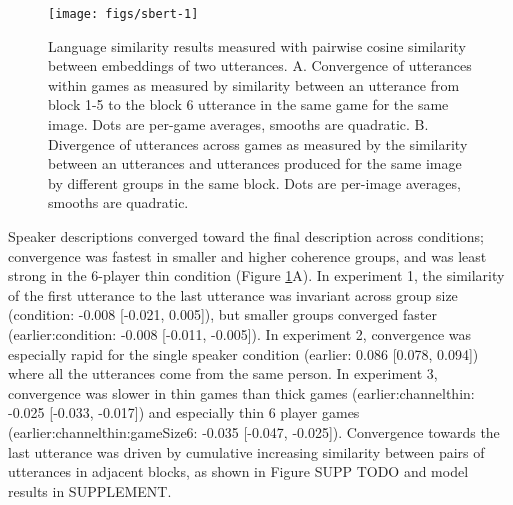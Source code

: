 \documentclass[
  english,
  a4paper,
]{article}
\begin{document}
\begin{figure}[t!]

{\centering \texttt{[image: figs/sbert-1]} 

}

\caption{Language similarity results measured with pairwise cosine similarity between embeddings of two utterances. A. Convergence of utterances within games as measured by similarity between an utterance from block 1-5 to the block 6 utterance in the same game for the same image. Dots are per-game averages, smooths are quadratic. B. Divergence of utterances across games as measured by the similarity between an utterances and utterances produced for the same image by different groups in the same block. Dots are per-image averages, smooths are quadratic.}\label{fig:sbert}
\end{figure}

Speaker descriptions converged toward the final description across conditions; convergence was fastest in smaller and higher coherence groups, and was least strong in the 6-player thin condition (Figure \ref{fig:sbert}A). In experiment 1, the similarity of the first utterance to the last utterance was invariant across group size (condition: -0.008 {[}-0.021, 0.005{]}), but smaller groups converged faster (earlier:condition: -0.008 {[}-0.011, -0.005{]}). In experiment 2, convergence was especially rapid for the single speaker condition (earlier: 0.086 {[}0.078, 0.094{]}) where all the utterances come from the same person. In experiment 3, convergence was slower in thin games than thick games (earlier:channelthin: -0.025 {[}-0.033, -0.017{]}) and especially thin 6 player games (earlier:channelthin:gameSize6: -0.035 {[}-0.047, -0.025{]}). Convergence towards the last utterance was driven by cumulative increasing similarity between pairs of utterances in adjacent blocks, as shown in Figure SUPP TODO and model results in SUPPLEMENT.
\end{document}
